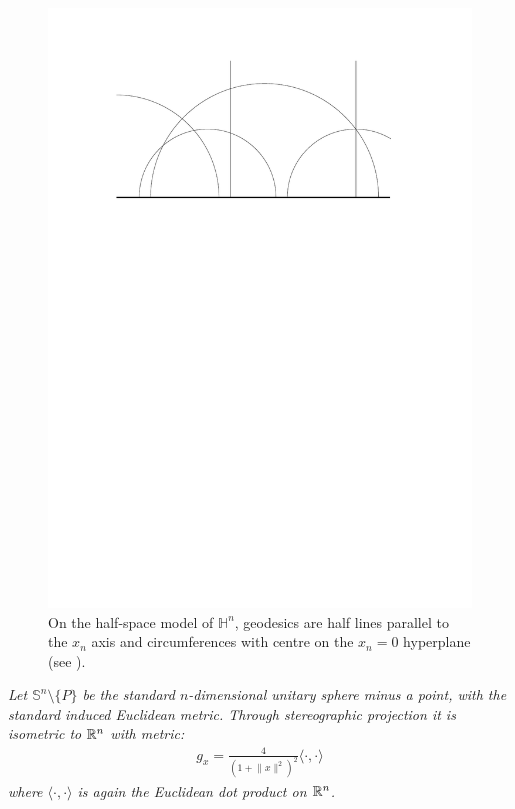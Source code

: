 \begin{figure}
	\centering
	\includegraphics[width=\textwidth]{figures/5_geodesics_hyperbolic_plane}
	\caption{On the half-space model of $\mathbb{H}^n$, geodesics are half lines parallel to the $x_n$ axis and circumferences with centre on the $x_n=0$ hyperplane (see \cite{LeeRiemannian2ndEd}).}
\end{figure}
\begin{oss}
	\em Let $\mathbb{S}^n \setminus \{P\}$ be the standard $n$-dimensional unitary sphere minus a point, with the standard induced Euclidean metric. Through stereographic projection it is isometric to $\mathbb{R}^n$ with metric:
	\begin{align*}
		g_x=\frac{4}{(1+\lVert x \rVert^2)^2} \langle\cdot, \cdot \rangle
	\end{align*}
	where $\langle\cdot, \cdot \rangle$ is again the Euclidean dot product on $\mathbb{R}^n$.
\end{oss}


